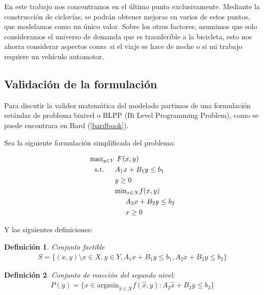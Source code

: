 \documentclass{article}
\newtheorem{definition}{Definición}
\newcommand{\modelspace}{\hspace{1.5em}}
\begin{document}
  En este trabajo nos concentramos en el último punto exclusivamente. Mediante la construcción de ciclovías, se podrán obtener mejoras en varios de estos puntos, que modelamos como un único valor. Sobre los otros factores, asumimos que solo consideramos el universo de demanda que es trasnferible a la bicicleta, esto nos ahorra considerar aspectos como: si el viaje se hace de noche o si mi trabajo requiere un vehículo automotor.

  \subsection{Validación de la formulación}

  Para discutir la validez matemática del modelado partimos de una formulación estándar de problema binivel o BLPP (Bi Level Programming Problem), como se puede encontrara en Bard (\ref{bardbook}).

  Sea la siguiente formulación simplificada del problema:

  \begin{align}
    \text{max}_{y \in Y}    & \; F(x, y) \label{bilevelgeneric1} \\
    \text{s.t.} \modelspace & A_1 x + B_1 y \leq b_1 \\
                            & y \geq 0 \\
                            & \text{min}_{x \in X} f(x, y) \\
                            & \modelspace A_2 x + B_2 y \leq b_2 \label{bilevelgeneric5} \\
                            & \modelspace x \geq 0 \label{bilevelgeneric6}
  \end{align}

  Y las siguientes definiciones:

  \begin{definition}
    Conjunto factible
    \begin{align}
      S = \{(x, y) \setminus x \in X, y \in Y, A_1 x + B_1 y \leq b_1, A_2 x + B_2 y \leq b_2 \}
    \end{align}
  \end{definition}

  \begin{definition}
    Conjunto de reacción del segundo nivel:
    \begin{align}
      P(y) = \{ x \in \text{argmin}_{\hat{x} \in X} f(\hat{x}, y) : A_2 \hat{x} + B_2 y \leq b_2 \}
    \end{align}
  \end{definition}
\end{document}
